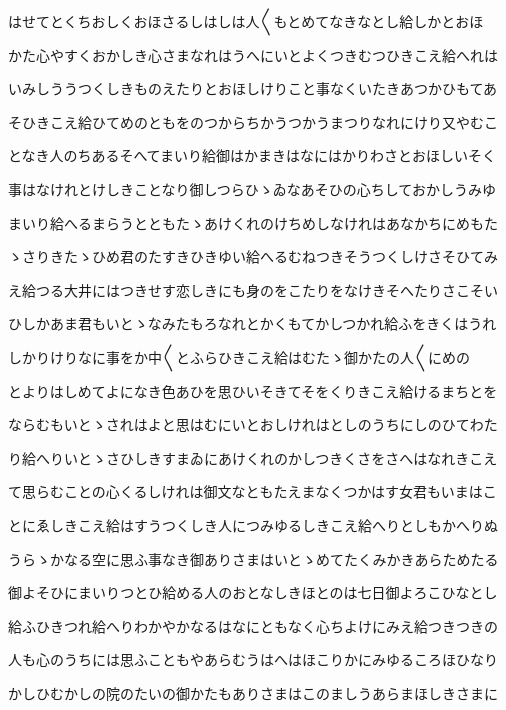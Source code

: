 \documentclass[a4paper,11pt,landscape]{ltjtarticle}
\begin{document}
\par\medskip
はせてとくちおしくおほさるしはしは人〱もとめてなきなとし給しかとおほ
\par\medskip
かた心やすくおかしき心さまなれはうへにいとよくつきむつひきこえ給へれは
\par\medskip
いみしううつくしきものえたりとおほしけりこと事なくいたきあつかひもてあ
\par\medskip
そひきこえ給ひてめのともをのつからちかうつかうまつりなれにけり又やむこ
\par\medskip
となき人のちあるそへてまいり給御はかまきはなにはかりわさとおほしいそく
\par\medskip
事はなけれとけしきことなり御しつらひゝゐなあそひの心ちしておかしうみゆ
\par\medskip
まいり給へるまらうとともたゝあけくれのけちめしなけれはあなかちにめもた
\par\medskip
ゝさりきたゝひめ君のたすきひきゆい給へるむねつきそうつくしけさそひてみ
\par\medskip
え給つる大井にはつきせす恋しきにも身のをこたりをなけきそへたりさこそい
\par\medskip
ひしかあま君もいとゝなみたもろなれとかくもてかしつかれ給ふをきくはうれ
\par\medskip
しかりけりなに事をか中〱とふらひきこえ給はむたゝ御かたの人〱にめの
\par\medskip
とよりはしめてよになき色あひを思ひいそきてそをくりきこえ給けるまちとを
\par\medskip
ならむもいとゝされはよと思はむにいとおしけれはとしのうちにしのひてわた
\par\medskip
り給へりいとゝさひしきすまゐにあけくれのかしつきくさをさへはなれきこえ
\par\medskip
て思らむことの心くるしけれは御文なともたえまなくつかはす女君もいまはこ
\par\medskip
とにゑしきこえ給はすうつくしき人につみゆるしきこえ給へりとしもかへりぬ
\par\medskip
うらゝかなる空に思ふ事なき御ありさまはいとゝめてたくみかきあらためたる
\par\medskip
御よそひにまいりつとひ給める人のおとなしきほとのは七日御よろこひなとし
\par\medskip
給ふひきつれ給へりわかやかなるはなにともなく心ちよけにみえ給つきつきの
\par\medskip
人も心のうちには思ふこともやあらむうはへはほこりかにみゆるころほひなり
\par\medskip
かしひむかしの院のたいの御かたもありさまはこのましうあらまほしきさまに
\par\medskip
\end{document}

